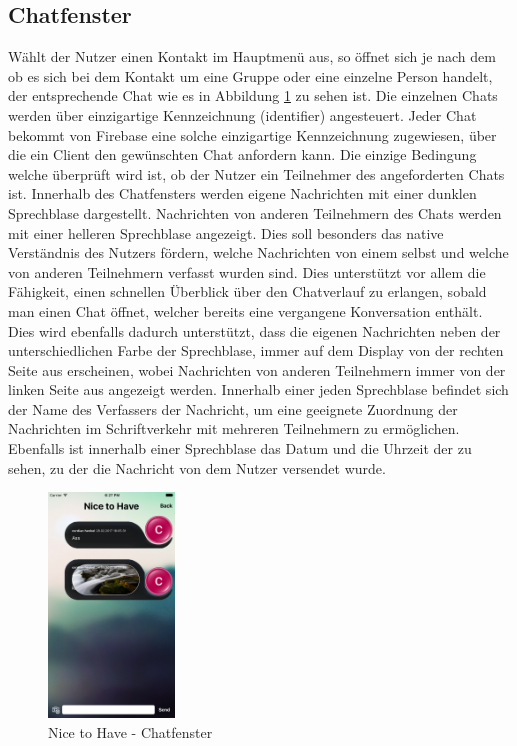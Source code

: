 \subsection{Chatfenster}
Wählt der Nutzer einen Kontakt im Hauptmenü aus, so öffnet sich je nach dem ob es sich bei dem Kontakt um eine Gruppe oder eine einzelne Person handelt, der entsprechende Chat wie es in Abbildung \ref{fig:chat_screen} zu sehen ist. Die einzelnen Chats werden über einzigartige Kennzeichnung (identifier) angesteuert. Jeder Chat bekommt von Firebase eine solche einzigartige Kennzeichnung zugewiesen, über die ein Client den gewünschten Chat anfordern kann. Die einzige Bedingung welche überprüft wird ist, ob der Nutzer ein Teilnehmer des angeforderten Chats ist.
\newline
\newline
Innerhalb des Chatfensters werden eigene Nachrichten mit einer dunklen Sprechblase dargestellt. Nachrichten von anderen Teilnehmern des Chats werden mit einer helleren Sprechblase angezeigt. Dies soll besonders das native Verständnis des Nutzers fördern, welche Nachrichten von einem selbst und welche von anderen Teilnehmern verfasst wurden sind. Dies unterstützt vor allem die Fähigkeit, einen schnellen Überblick über den Chatverlauf zu erlangen, sobald man einen Chat öffnet, welcher bereits eine vergangene Konversation enthält. Dies wird ebenfalls dadurch unterstützt, dass die eigenen Nachrichten neben der unterschiedlichen Farbe der Sprechblase, immer auf dem Display von der rechten Seite aus erscheinen, wobei Nachrichten von anderen Teilnehmern immer von der linken Seite aus angezeigt werden. Innerhalb einer jeden Sprechblase befindet sich der Name des Verfassers der Nachricht, um eine geeignete Zuordnung der Nachrichten im Schriftverkehr mit mehreren Teilnehmern zu ermöglichen. Ebenfalls ist innerhalb einer Sprechblase das Datum und die Uhrzeit der zu sehen, zu der die Nachricht von dem Nutzer versendet wurde.
\begin{figure}[ht]
  \centering
    \includegraphics[width=0.3\textwidth]{images/chat_screen}
    \caption{Nice to Have - Chatfenster}
	 \label{fig:chat_screen}
\end{figure}
